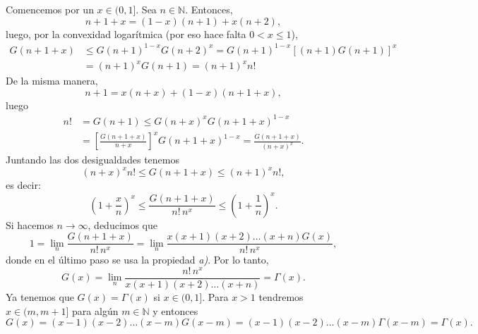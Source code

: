 \documentclass[11pt]{book}
\theoremstyle{plain} %
\theoremstyle{definition} %
\newcommand\N{\mathbb{N}}
\begin{document}
Comencemos por un $x \in (0,1]$. Sea $n \in \N$. Entonces,
\[
   n + 1 + x = (1-x) (n+1) + x (n+2),
\]
luego, por la convexidad logarítmica (por 
eso hace falta $0 < x \leq 1$),
\begin{align*}
   G(n+1+x) &\leq G(n+1)^{1-x} G(n+2)^x
   = G(n+1)^{1-x} \left[ (n+1) G(n+1) \right]^x
   \\
   &= (n+1)^x G(n+1)
   = (n+1)^x n!
\end{align*}
De la misma manera,
\[
   n + 1 = x (n+x) + (1-x)(n+1+x),
\]
luego
\begin{align*}
   n! &= G(n+1) \leq G(n+x)^x G(n+1+x)^{1-x}
   \\
   &= \left[\frac{G(n+1+x)}{n+x} \right]^x G(n+1+x)^{1-x}
   = \frac{G(n+1+x)}{(n+x)^x}.
\end{align*}
Juntando las dos desigualdades tenemos
\[
   (n+x)^x n! \leq G(n+1+x) \leq (n+1)^x n!,
\]
es decir:
\[
   \left( 1 + \frac{x}{n} \right)^x 
   \leq \frac{G(n+1+x)}{n! \, n^x}
   \leq \left( 1 + \frac{1}{n} \right)^x.
\]
Si hacemos $n \to \infty$, deducimos que
\[
   1 = \lim_n \frac{G(n+1+x)}{n! \, n^x}
   = \lim_n \frac{x (x+1) (x+2) \dots (x+n) G(x)}{n! \, n^x},
\]
donde en el último paso se usa la propiedad \emph{a)}. Por lo tanto,
\[
   G(x) = \lim_n \frac{n! \, n^x}{x (x+1) (x+2) \dots (x+n)} = \Gamma(x).
\]
Ya tenemos que $G(x) = \Gamma(x)$ si $x \in (0,1]$. Para $x > 1$ tendremos $x \in 
(m,m+1]$ para algún $m \in \N$ y entonces
\[
   G(x) = (x-1) (x-2) \dots (x-m) G(x-m)
   = (x-1) (x-2) \dots (x-m) \Gamma(x-m)
   = \Gamma(x).
\]

\end{document}
